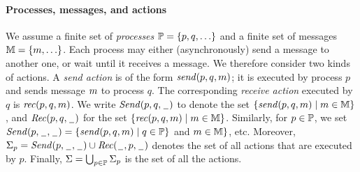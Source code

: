 \paragraph*{Processes, messages, and actions}
We assume a finite set of \emph{processes} $\Procs=\{p,q,\ldots\}$ and a finite set of messages $\Msg=\{\msg,\ldots\}$.
Each process may either (asynchronously) send a message to another one, or wait until it receives a message.
We therefore consider two kinds of actions. A \emph{send action} is of the form $\sact{p}{q}{\msg}$;
it is executed by process $p$ and sends message $\msg$ to process $q$.
The corresponding \emph{receive action} executed by $q$ is $\ract{p}{q}{\msg}$.
%
We write $\pqsAct{p}{q}$ to denote the set $\{\sact{p}{q}{\msg} \mid \msg \in \Msg\}$, and
$\pqrAct{p}{q}$ for the set $\{\ract{p}{q}{\msg} \mid \msg \in \Msg\}$.
Similarly, for $p \in \Procs$, we set
$\psAct{p} = \{\sact{p}{q}{\msg} \mid q \in \Procs
\}$ and $\msg \in \Msg\}$, etc.
Moreover, $\pAct{p} = \psAct{p} \cup \qrAct{p}$ denotes the set of all actions that are
executed by $p$.
Finally, $\Act = \bigcup_{p \in \Procs} \pAct{p}$
is the set of all the actions.

